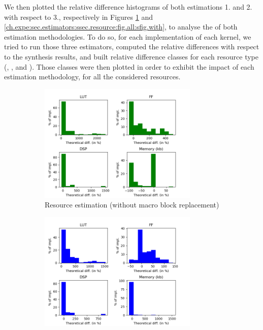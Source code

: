         We then plotted the relative difference histograms of both estimations 1. and 2. with respect to 3., respectively in Figures \ref{ch.expe:sec.estimators:ssec.resource:fig.all:sfig.without} and \ref{ch.expe:sec.estimators:ssec.resource:fig.all:sfig.with}, to analyse the  of both estimation methodologies.
        To do so, for each implementation of each kernel, we tried to run those three estimators, computed the relative differences with respect to the synthesis results, and built relative difference classes for each resource type (, ,  and ).
        Those classes were then plotted in order to exhibit the impact of each estimation methodology, for all the considered resources.
        
        \begin{figure}[h!]
            \vspace{-0.2cm}
            \centering
            \begin{subfigure}{1.0\textwidth}
                \centering
                \includegraphics[width=0.83\textwidth]{Figures/results/allRelativeWithoutMacro}
                \caption{Resource estimation (without macro block replacement)}
                \label{ch.expe:sec.estimators:ssec.resource:fig.all:sfig.without}
            \end{subfigure}
            \begin{subfigure}{1.0\textwidth}
                \centering
                \includegraphics[width=0.83\textwidth]{Figures/results/allRelativeWithMacro}

\end{subfigure}
\end{figure}
